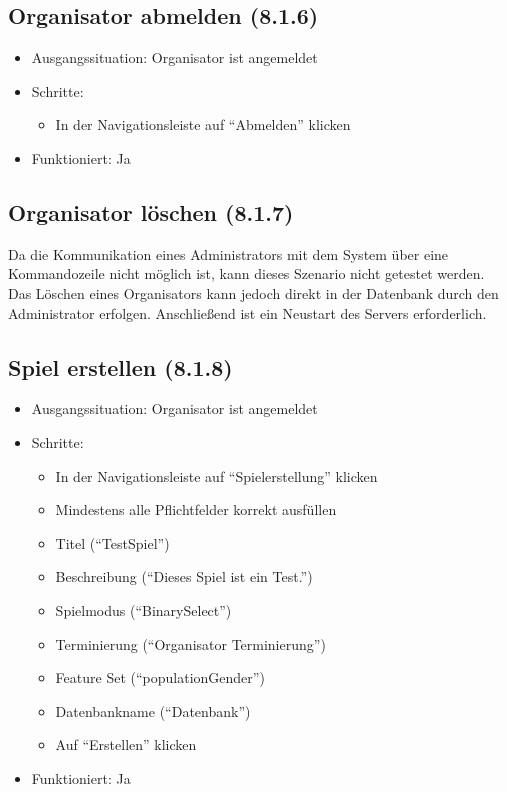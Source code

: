 \documentclass[a4paper]{scrreprt}
\begin{document}
            \subsection{Organisator abmelden (8.1.6)}
            \begin{itemize}
                \item Ausgangssituation: Organisator ist angemeldet
                \item Schritte:
                    \begin{itemize}
                        \item In der Navigationsleiste auf \enquote{Abmelden} klicken
                    \end{itemize}
                \item Funktioniert: Ja
            \end{itemize}

            \subsection{Organisator löschen (8.1.7)}
            Da die Kommunikation eines Administrators mit dem System über eine Kommandozeile nicht möglich ist, kann dieses Szenario nicht getestet werden.
            Das Löschen eines Organisators kann jedoch direkt in der Datenbank durch den Administrator erfolgen. Anschließend ist ein Neustart des Servers erforderlich.

            \subsection{Spiel erstellen (8.1.8)}
            \begin{itemize}
                \item Ausgangssituation: Organisator ist angemeldet
                \item Schritte:
                    \begin{itemize}
                        \item In der Navigationsleiste auf \enquote{Spielerstellung} klicken
                        \item Mindestens alle Pflichtfelder korrekt ausfüllen
                        \item Titel (\enquote{TestSpiel})
                        \item Beschreibung (\enquote{Dieses Spiel ist ein Test.})
                        \item Spielmodus (\enquote{BinarySelect})
                        \item Terminierung (\enquote{Organisator Terminierung})
                        \item Feature Set (\enquote{populationGender})
                        \item Datenbankname (\enquote{Datenbank})
                        \item Auf \enquote{Erstellen} klicken
                    \end{itemize}
                \item Funktioniert: Ja
            \end{itemize}
\end{document}

